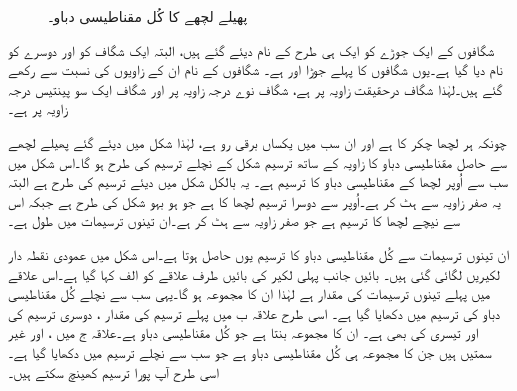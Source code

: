 \begin{figure}
\caption{پھیلے لچھے کا کُل مقناطیسی دباو۔}
\label{شکل_گھومتے_مشین_پھیلے_لچھے_کی_دباو}
\end{figure}


شگافوں کے ایک جوڑے کو ایک ہی طرح کے نام دیئے گئے ہیں، البتہ ایک شگاف کو  اور دوسرے کو  نام دیا گیا ہے۔یوں شگافوں کا پہلے جوڑا   اور   ہے۔   شگافوں کے نام ان کے زاویوں کی نسبت سے رکھے گئے ہیں۔لہٰذا شگاف   درحقیقت  زاویہ پر ہے، شگاف  نوے درجہ زاویہ پر اور شگاف   ایک سو پینتیس درجہ زاویہ پر ہے۔

چونکہ ہر لچھا  چکر کا ہے اور ان سب میں یکساں برقی رو  ہے،  لہٰذا  شکل    میں دیئے گئے پھیلے لچھے سے حاصل مقناطیسی دباو کا زاویہ کے ساتھ ترسیم شکل   کے نچلے ترسیم کی طرح ہو گا۔اس شکل میں سب سے اُوپر لچھا    کے مقناطیسی دباو کا ترسیم ہے۔ یہ بالکل شکل   میں دیئے ترسیم کی طرح ہے البتہ یہ صفر زاویہ سے  ہٹ کر ہے۔اُوپر سے دوسرا ترسیم لچھا  کا ہے جو ہو بہو شکل  کی طرح ہے جبکہ اس سے نیچے لچھا  کا ترسیم ہے جو صفر زاویہ سے  ہٹ کر ہے۔ان تینوں ترسیمات میں طول  ہے۔

ان تینوں ترسیمات سے کُل مقناطیسی دباو کا ترسیم یوں حاصل ہوتا ہے۔اس شکل میں عمودی نقطہ دار لکیریں لگائی گئی ہیں۔ بائیں جانب پہلی لکیر کی بائیں طرف علاقے کو الف کہا گیا ہے۔اس علاقے میں پہلے تینوں ترسیمات کی مقدار  ہے لہٰذا ان کا مجموعہ  ہو گا۔یہی سب سے نچلے کُل مقناطیسی دباو کی ترسیم میں دکھایا گیا ہے۔ اسی طرح علاقہ ب میں پہلے ترسیم کی مقدار  ، دوسری ترسیم کی  اور تیسری کی بھی  ہے۔ ان کا مجموعہ  بنتا ہے جو کُل مقناطیسی دباو ہے۔علاقہ ج میں
 ،  اور  غیر سمتیں ہیں جن کا مجموعہ  ہی کُل مقناطیسی دباو ہے جو سب سے نچلے ترسیم میں دکھایا گیا ہے۔ اسی طرح آپ پورا ترسیم کھینچ سکتے ہیں۔

